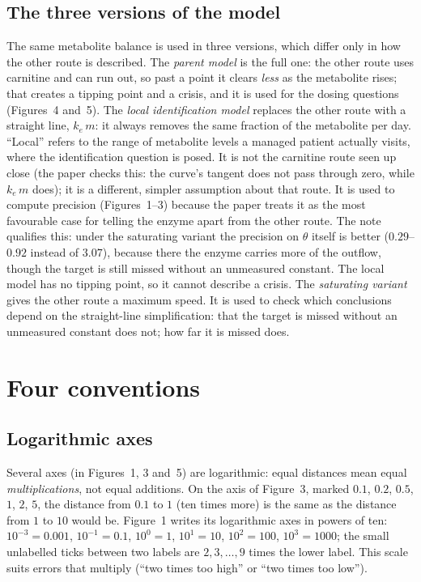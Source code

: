 \documentclass[11pt,a4paper]{article}
\begin{document}
\subsection{The three versions of the model} The same metabolite balance is used in three
versions, which differ only in how the other route is described. The \emph{parent model} is the
full one: the other route uses carnitine and can run out, so past a point it clears \emph{less} as
the metabolite rises; that creates a tipping point and a crisis, and it is used for the dosing
questions (Figures~4 and~5). The \emph{local identification model} replaces the other route with a
straight line, $k_e\,m$: it always removes the same fraction of the metabolite per day.
``Local'' refers to the range of metabolite levels a managed patient actually visits, where the
identification question is posed. It is not the carnitine route seen up close (the paper checks
this: the curve's tangent does not pass through zero, while $k_e\,m$ does); it is a different,
simpler assumption about that route. It is used to compute precision (Figures~1--3) because the
paper treats it as the most favourable case for telling the enzyme apart from the other route.
The note qualifies this: under the saturating variant the precision on $\theta$ itself is better
($0.29$--$0.92$ instead of $3.07$), because there the enzyme carries more of the outflow, though
the target is still missed without an unmeasured constant. The local model has no tipping point,
so it cannot describe a crisis. The \emph{saturating variant} gives the other route a maximum
speed. It is used to check which conclusions depend on the straight-line simplification: that
the target is missed without an unmeasured constant does not; how far it is missed does.

\section{Four conventions}


\subsection{Logarithmic axes} Several axes (in Figures~1, 3 and~5) are logarithmic: equal distances
mean equal \emph{multiplications}, not equal additions. On the axis of Figure~3, marked $0.1$,
$0.2$, $0.5$, $1$, $2$, $5$, the distance from $0.1$ to $1$ (ten times more) is the same as the
distance from $1$ to $10$ would be. Figure~1 writes its logarithmic axes in powers of ten:
$10^{-3}=0.001$, $10^{-1}=0.1$, $10^0=1$, $10^1=10$, $10^2=100$, $10^3=1000$; the small
unlabelled ticks between two labels are $2, 3, \dots, 9$ times the lower label. This scale
suits errors that multiply (``two times too high'' or ``two times too low'').
\end{document}
